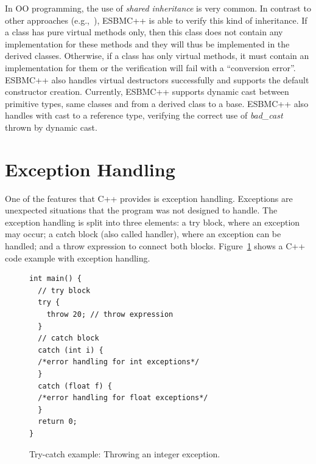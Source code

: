 \documentclass[conference]{IEEEtran}
\begin{document}
In OO programming, the use of \textit{shared inheritance} is very common.
In contrast to other approaches (e.g.,~\cite{Blanc07}), ESBMC++ is able to
verify this kind of inheritance. If a class has pure virtual methods only,
then this class does not contain any implementation for these methods and they will
thus be implemented in the derived classes. Otherwise, if a class has only virtual
methods, it must contain an implementation for them or the verification will fail
with a ``conversion error''. ESBMC++ also handles virtual destructors successfully
and supports the default constructor creation. Currently, ESBMC++
supports dynamic cast between primitive types, same classes and from a derived
class to a base. ESBMC++ also handles with cast to a reference type, verifying the
correct use of \textit{bad\_cast} thrown by dynamic cast.


\section{Exception Handling}
\label{exception-handling}

One of the features that C++ provides is exception handling. 
Exceptions are unexpected situations 
that the program was not designed to handle. The exception handling 
is split into three elements: a try block, where an exception may occur; 
a catch block (also called handler), where an exception can be handled; and a throw 
expression to connect both blocks. Figure~\ref{figure:try-catch-example} 
shows a C++ code example with exception handling.
%
\begin{figure}[ht]
\centering
\begin{minipage}{0.45\textwidth}
\begin{lstlisting}
int main() {
  // try block
  try { 
    throw 20; // throw expression
  } 
  // catch block
  catch (int i) { 
  /*error handling for int exceptions*/ 
  }
  catch (float f) { 
  /*error handling for float exceptions*/ 
  }
  return 0;
}
\end{lstlisting}
\end{minipage}
\caption{Try-catch example: Throwing an integer exception.} 
\label{figure:try-catch-example}
\end{figure}
\end{document}
